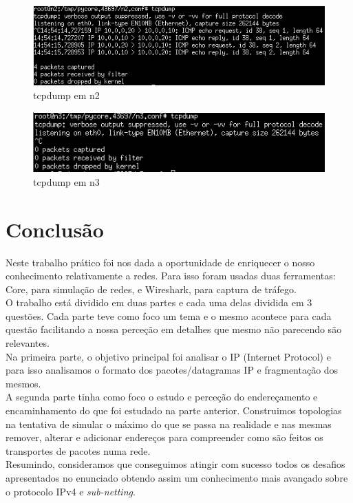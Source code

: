 \documentclass[a4paper]{report}
\begin{document}
\begin{figure}[H]
    \centering 
    \includegraphics[width=\textwidth]{images/ex18tcpdumpn2.png}
    \caption{tcpdump em n2}
    \label{fig:ex18tcpdumpn2}
\end{figure}

\begin{figure}[H]
    \centering 
    \includegraphics[width=\textwidth]{images/ex18tcpdumpn3.png}
    \caption{tcpdump em n3}
    \label{fig:ex18tcpdumpn3}
\end{figure}
\chapter{Conclusão}
Neste trabalho prático foi nos dada a oportunidade de enriquecer o nosso
conhecimento relativamente a redes. Para isso foram usadas duas ferramentas:
Core, para simulação de redes, e Wireshark, para captura de tráfego.\\
O trabalho está dividido em duas partes e cada uma delas dividida em 3 questões.
Cada parte teve como foco um tema e o mesmo acontece para cada questão
facilitando a nossa perceção em detalhes que mesmo não parecendo são
relevantes.\\
Na primeira parte, o objetivo principal foi analisar o IP (Internet Protocol) e
para isso analisamos o formato dos pacotes/datagramas IP e fragmentação dos
mesmos.\\
A segunda parte tinha como foco o estudo e perceção do endereçamento e
encaminhamento do que foi estudado na parte anterior. Construimos topologias na
tentativa de simular o máximo do que se passa na realidade e nas mesmas remover,
alterar e adicionar endereços para compreender como são feitos os transportes de
pacotes numa rede.\\
Resumindo, consideramos que conseguimos atingir com sucesso todos os
desafios apresentados no enunciado obtendo assim um conhecimento mais avançado
sobre o protocolo IPv4 e \textit{sub-netting}.
\end{document}
